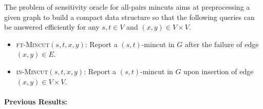 The problem of sensitivity oracle for all-pairs mincuts aims at preprocessing a given graph to build a compact data structure so that the following queries can be answered efficiently for any $s,t\in V$ and $(x,y) \in V \times V$.

\begin{itemize}
    \item {\textsc{ft-Mincut}}$(s,t,x,y)$: Report a $(s,t)$-mincut in $G$ after the failure of edge $(x,y)\in E$.
    \item {\textsc{in-Mincut}}$(s,t,x,y)$: Report a $(s,t)$-mincut in $G$ upon insertion of edge $(x,y)\in V \times V$.
\end{itemize}










\paragraph{Previous Results:} 
\label{sec:previous-results}


